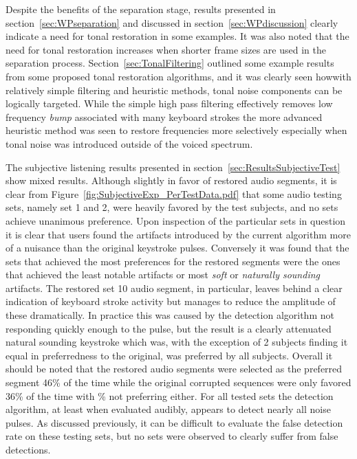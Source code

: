 Despite the benefits of the separation stage, results presented in section~\ref{sec:WPseparation} and discussed in section~\ref{sec:WPdiscussion} clearly indicate a need for tonal restoration in some examples. It was also noted that the need for tonal restoration increases when shorter frame sizes are used in the separation process. Section~\ref{sec:TonalFiltering} outlined some example results from \DIFdelbegin {}\DIFdelend some proposed tonal restoration algorithms, and it was clearly seen how\DIFaddbegin \DIFadd{, }\DIFaddend with relatively simple filtering and heuristic methods, tonal noise components can be logically targeted. While the simple high pass filtering effectively removes low frequency \emph{bump} associated with many keyboard strokes the more advanced heuristic method was seen to restore frequencies more selectively especially when tonal noise was introduced outside of the voiced spectrum.

The subjective listening results presented in section~\ref{sec:ResultsSubjectiveTest} show mixed results. Although slightly in favor of restored audio segments, it is clear from Figure~\ref{fig:SubjectiveExp_PerTestData.pdf} that some audio testing sets, namely set 1 and 2, were heavily favored by the test subjects, and no sets achieve unanimous preference. Upon inspection of the particular sets in question it is clear that users found the artifacts introduced by the current algorithm more of a nuisance than the original keystroke pulses. Conversely it was found that the sets that achieved the most preferences for the restored segments were the ones that achieved the least notable artifacts or most \emph{soft} or \emph{naturally sounding} artifacts. The restored set 10 audio segment, in particular, leaves behind a clear indication of keyboard stroke activity but manages to reduce the amplitude of these dramatically. In practice this was caused by the detection algorithm not responding quickly enough to the pulse, but the result is a clearly attenuated natural sounding keystroke which was, with the exception of 2 subjects finding it equal in preferredness to the original, was preferred by all subjects. Overall it should be noted that the restored audio segments were selected as the preferred segment 46\% of the time while the original corrupted sequences were only favored 36\% of the time with \DIFdelbegin {}\% not preferring either. For all tested sets the detection algorithm, at least when evaluated audibly, appears to detect nearly all noise pulses. As discussed previously, it can be difficult to evaluate the false detection rate on these testing sets, but no sets were observed to clearly suffer from false detections.

